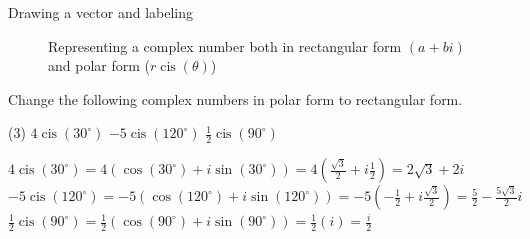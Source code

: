 \begin{frame}{Drawing a vector and labeling}
  \begin{figure}[h!]
  \centering
    \caption{Representing a complex number both in rectangular form $(a+bi)$ and polar form ($r\operatorname{cis}\!\left(\theta\right)$)}
  \end{figure}
\end{frame}

\begin{frame}[t]
\begin{ex}
Change the following complex numbers in polar form to rectangular form.
\begin{tasks}(3)
\task $4\operatorname{cis}\!\left(30^\circ\right)$
\task $-5\operatorname{cis}\!\left(120^\circ\right)$
\task $\frac{1}{2} \operatorname{cis}\!\left(90^\circ\right)$
\end{tasks}
\end{ex}
\begin{sol}
\begin{tasks}
\task $4\operatorname{cis}\!\left(30^\circ\right) = 4(\cos(30^\circ) + i\sin(30^\circ)) = 4 \left( \frac{\sqrt{3}}{2} + i \frac{1}{2}\right) = 2 \sqrt{3} + 2i$
\task $-5\operatorname{cis}\!\left(120^\circ\right) = -5(\cos(120^\circ) + i\sin(120^\circ)) = -5 \left( -\frac{1}{2} + i \frac{\sqrt{3}}{2}\right) = \frac{5}{2} - \frac{5\sqrt{3}}{2}i$
\task $\frac{1}{2} \operatorname{cis}\!\left(90^\circ\right) = \frac{1}{2} (\cos(90^\circ) + i\sin(90^\circ)) = \frac{1}{2}(i) = \frac{i}{2}$
\end{tasks}
\end{sol}
\end{frame}

